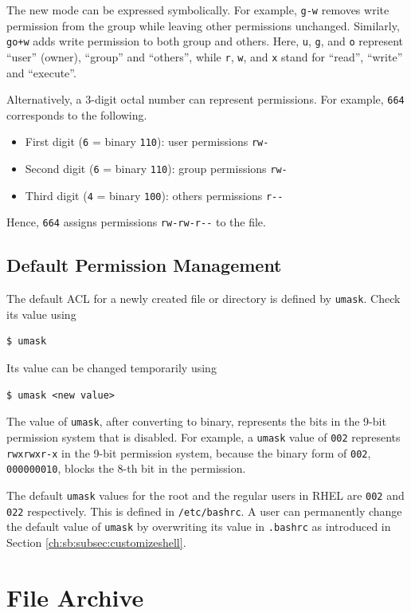 The new mode can be expressed symbolically. For example, \verb|g-w| removes write permission from the group while leaving other permissions unchanged. Similarly, \verb|go+w| adds write permission to both group and others. Here, \verb|u|, \verb|g|, and \verb|o| represent ``user'' (owner), ``group'' and ``others'', while \verb|r|, \verb|w|, and \verb|x| stand for ``read'', ``write'' and ``execute''.

Alternatively, a $3$-digit octal number can represent permissions. For example, \verb|664| corresponds to the following.
\begin{itemize}
  \item First digit (\verb|6| = binary \verb|110|): user permissions \verb|rw-|
  \item Second digit (\verb|6| = binary \verb|110|): group permissions \verb|rw-|
  \item Third digit (\verb|4| = binary \verb|100|): others permissions \verb|r--|
\end{itemize}
Hence, \verb|664| assigns permissions \verb|rw-rw-r--| to the file.


\subsection{Default Permission Management}

The default ACL for a newly created file or directory is defined by \verb|umask|. Check its value using
\begin{lstlisting}
$ umask
\end{lstlisting}
Its value can be changed temporarily using
\begin{lstlisting}
$ umask <new value>
\end{lstlisting}

The value of \verb|umask|, after converting to binary, represents the bits in the 9-bit permission system that is disabled. For example, a \verb|umask| value of \verb|002| represents \verb|rwxrwxr-x| in the 9-bit permission system, because the binary form of \verb|002|, \verb|000000010|, blocks the $8$-th bit in the permission.

The default \verb|umask| values for the root and the regular users in RHEL are \verb|002| and \verb|022| respectively. This is defined in \verb|/etc/bashrc|. A user can permanently change the default value of \verb|umask| by overwriting its value in \verb|.bashrc| as introduced in Section \ref{ch:sb:subsec:customizeshell}.

\section{File Archive}

